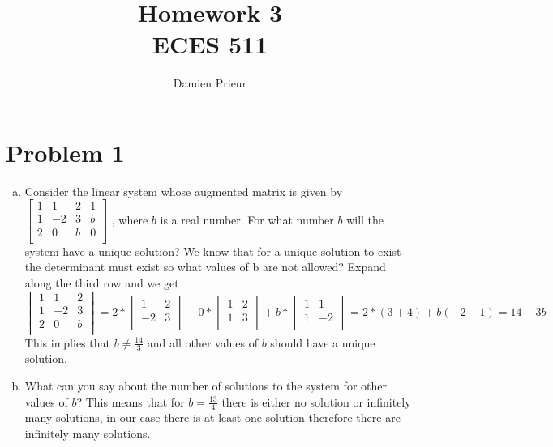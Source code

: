 \documentclass{article}
\author{Damien Prieur}
\title{Homework 3 \\ ECES 511}
\date{}
\begin{document}
\maketitle

\section*{Problem 1}
\begin{enumerate}[a)]
\item Consider the linear system whose augmented matrix is given by
$
\left[
\begin{array}{ccc|c}
1 &  1 & 2 & 1 \\
1 & -2 & 3 & b \\
2 &  0 & b & 0 \\
\end{array}
\right]
$
, where $b$ is a real number.
For what number $b$ will the system have a unique solution?
\newline
\newline
We know that for a unique solution to exist the determinant must exist so what values of b are not allowed?
Expand along the third row and we get
$$
\begin{vmatrix}
1 &  1 & 2 \\
1 & -2 & 3 \\
2 &  0 & b \\
\end{vmatrix}
=
 2 * \begin{vmatrix} 1 & 2 \\ -2 & 3\\ \end{vmatrix}
-0 * \begin{vmatrix} 1 & 2 \\  1 & 3\\ \end{vmatrix}
+b * \begin{vmatrix} 1 & 1 \\  1 &-2\\ \end{vmatrix}
= 2*(3+4) + b(-2 -1)
=14 - 3b
$$
This implies that $b \neq \frac{14}{3}$ and all other values of $b$ should have a unique solution.





\item What can you say about the number of solutions to the system for other values of $b$?
\newline
\newline
This means that for $b=\frac{13}{4}$ there is either no solution or infinitely many solutions, in our case there is at least one solution therefore there are infinitely many solutions.

\end{enumerate}
\end{document}
